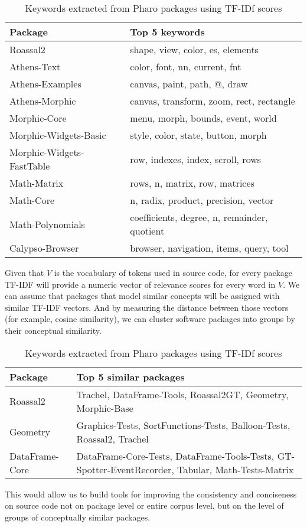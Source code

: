 \begin{table}[H]
\centering
\begin{tabular}{|l|l|}
  \hline
  \textbf{Package} & \textbf{Top 5 keywords} \\
  \hline
  Roassal2 & shape, view, color, es, elements \\
  Athens-Text & color, font, nn, current, fnt \\
  Athens-Examples & canvas, paint, path, @, draw \\
  Athens-Morphic & canvas, transform, zoom, rect, rectangle \\
  Morphic-Core & menu, morph, bounds, event, world \\
  Morphic-Widgets-Basic & style, color, state, button, morph \\
  Morphic-Widgets-FastTable & row, indexes, index, scroll, rows \\
  Math-Matrix & rows, n, matrix, row, matrices \\
  Math-Core & n, radix, product, precision, vector \\
  Math-Polynomials & coefficients, degree, n, remainder, quotient \\
  Calypso-Browser & browser, navigation, items, query, tool \\
  \hline
\end{tabular}
\caption{Keywords extracted from Pharo packages using TF-IDf scores}
\end{table}

Given that $V$ is the vocabulary of tokens used in source code, for every package TF-IDF will provide a numeric vector of relevance scores for every word in $V$. We can assume that packages that model similar concepts will be assigned with similar TF-IDF vectors. And by measuring the distance between those vectors (for example, cosine similarity), we can cluster software packages into groups by their conceptual similarity.

\begin{table}[H]
\centering
\begin{tabular}{|l|p{9cm}|}
  \hline
  \textbf{Package} & \textbf{Top 5 similar packages} \\
  \hline
  Roassal2 & Trachel, DataFrame-Tools, Roassal2GT, Geometry, Morphic-Base \\
  \hline
  Geometry & Graphics-Tests, SortFunctions-Tests, Balloon-Tests, Roassal2, Trachel\\
  \hline
  DataFrame-Core & DataFrame-Core-Tests, DataFrame-Tools-Tests, GT-Spotter-EventRecorder, Tabular, Math-Tests-Matrix \\
  \hline
\end{tabular}
\caption{Keywords extracted from Pharo packages using TF-IDf scores}
\end{table}

This would allow us to build tools for improving the consistency and conciseness on source code not on package level or entire corpus level, but on the level of groups of conceptually similar packages.
